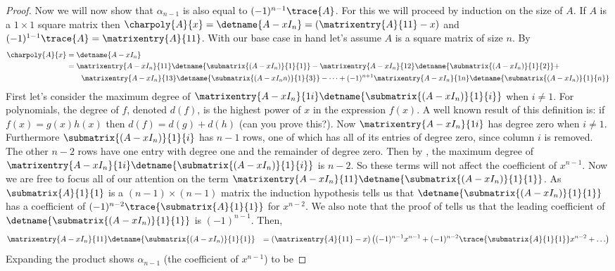 \begin{proof}
%
Now we will now show that $\alpha_{n-1}$ is also equal to $(-1)^{n-1}\trace{A}$.  For this we will proceed by induction on the size of $A$.  If $A$ is a $1 \times 1$ square matrix then $\charpoly{A}{x}=\detname{A-xI_{n}}=\left(\matrixentry{A}{11}-x\right)$ and $(-1)^{1-1}\trace{A}=\matrixentry{A}{11}$.  With our base case in hand let's assume $A$ is a square matrix of size $n$.  By 
%
\begin{align*}
\charpoly{A}{x}
&=\detname{A-xI_{n}}\\
&=
\matrixentry{A-xI_{n}}{11}\detname{\submatrix{(A-xI_{n})}{1}{1}}-
\matrixentry{A-xI_{n}}{12}\detname{\submatrix{(A-xI_{n})}{1}{2}}+\\
&\quad\quad
\matrixentry{A-xI_{n}}{13}\detname{\submatrix{(A-xI_n{n})}{1}{3}}-
\cdots+(-1)^{n+1}\matrixentry{A-xI_{n}}{1n}\detname{\submatrix{(A-xI_{n})}{1}{n}}
\end{align*}
%
First let's consider the maximum degree of $\matrixentry{A-xI_{n}}{1i}\detname{\submatrix{(A-xI_{n})}{1}{i}}$ when $i \neq 1$. For polynomials, the degree of $f$, denoted $d(f)$, is the highest power of $x$ in the expression $f(x)$. A well known result of this definition is: if $f(x)=g(x)h(x)$ then $d(f) = d(g)+d(h)$ (can you prove this?). Now $\matrixentry{A-xI_{n}}{1i}$ has degree zero when $i \neq 1$.  Furthermore $\submatrix{(A-xI_{n})}{1}{i}$ has $n-1$ rows, one of which has all of its entries of degree zero, since column $i$ is removed.  The other $n-2$ rows have one entry with degree one and the remainder of degree zero.  Then by , the maximum degree of $\matrixentry{A-xI_{n}}{1i}\detname{\submatrix{(A-xI_{n})}{1}{i}}$ is $n-2$.  So these terms will not affect the coefficient of $x^{n-1}$.  Now we are free to focus all of our attention on the term $\matrixentry{A-xI_{n}}{11}\detname{\submatrix{(A-xI_{n})}{1}{1}}$.  As $\submatrix{A}{1}{1}$ is a $(n-1) \times (n-1)$ matrix the induction hypothesis tells us that $\detname{\submatrix{(A-xI_{n})}{1}{1}}$ has a coefficient of $(-1)^{n-2}\trace{\submatrix{A}{1}{1}}$ for $x^{n-2}$. We also note that the proof of  tells us that the leading coefficient of $\detname{\submatrix{(A-xI_{n})}{1}{1}}$ is $(-1)^{n-1}$. Then,
%
\begin{align*}
\matrixentry{A-xI_{n}}{11}&\detname{\submatrix{(A-xI_{n})}{1}{1}}
&=\left(\matrixentry{A}{11}-x\right)\left((-1)^{n-1}x^{n-1}
+(-1)^{n-2}\trace{\submatrix{A}{1}{1}}x^{n-2}
+\ldots\right)
\end{align*}
%
Expanding the product shows $\alpha_{n-1}$ (the coefficient of $x^{n-1}$) to be

\end{proof}
